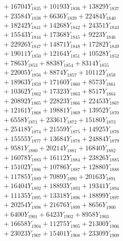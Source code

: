 \documentclass[a4paper,10pt]{article}
\begin{document}
{\begin{align}
&\;  + 16704 Y_{1835} + 10193 Y_{1836} + 13829 Y_{1837} \\[0.3ex]
&\;  + 23584 Y_{1838} + 6636 Y_{1839} + 22484 Y_{1840} \\[0.3ex]
&\;  + 18242 Y_{1841} + 14268 Y_{1842} + 24351 Y_{1843} \\[0.3ex]
&\;  + 15543 Y_{1844} + 17368 Y_{1845} + 9223 Y_{1846} \\[0.3ex]
&\;  + 22926 Y_{1847} + 14871 Y_{1848} + 17282 Y_{1849} \\[0.3ex]
&\;  + 19011 Y_{1850} + 12164 Y_{1851} + 10528 Y_{1852} \\[0.3ex]
&\;  + 7863 Y_{1853} + 8838 Y_{1854} + 8314 Y_{1855} \\[0.3ex]
&\;  + 22005 Y_{1856} + 8874 Y_{1857} + 10112 Y_{1858} \\[0.5ex]\allowbreak
&\;  + 18963 Y_{1859} + 17160 Y_{1860} + 8573 Y_{1861} \\[0.3ex]
&\;  + 10362 Y_{1862} + 17323 Y_{1863} + 8517 Y_{1864} \\[0.3ex]
&\;  + 20892 Y_{1865} + 22823 Y_{1866} + 22453 Y_{1867} \\[0.3ex]
&\;  + 12161 Y_{1868} + 19881 Y_{1869} + 13952 Y_{1870} \\[0.3ex]
&\;  + 6558 Y_{1871} + 23361 Y_{1872} + 15180 Y_{1873} \\[0.3ex]
&\;  + 25418 Y_{1874} + 21559 Y_{1875} + 14925 Y_{1876} \\[0.3ex]
&\;  + 15555 Y_{1877} + 13684 Y_{1878} + 24884 Y_{1879} \\[0.3ex]
&\;  + 9581 Y_{1880} + 20214 Y_{1881} + 16840 Y_{1882} \\[0.3ex]
&\;  + 16078 Y_{1883} + 16112 Y_{1884} + 23826 Y_{1885} \\[0.3ex]
&\;  + 15102 Y_{1886} + 10786 Y_{1887} + 12880 Y_{1888} \\[0.5ex]\allowbreak
&\;  + 11785 Y_{1889} + 7089 Y_{1890} + 20163 Y_{1891} \\[0.3ex]
&\;  + 16404 Y_{1892} + 18893 Y_{1893} + 19341 Y_{1894} \\[0.3ex]
&\;  + 11135 Y_{1895} + 13318 Y_{1896} + 18899 Y_{1897} \\[0.3ex]
&\;  + 20254 Y_{1898} + 21676 Y_{1899} + 8656 Y_{1900} \\[0.3ex]
&\;  + 6400 Y_{1901} + 6423 Y_{1902} + 8958 Y_{1903} \\[0.3ex]
&\;  + 16658 Y_{1904} + 11275 Y_{1905} + 21300 Y_{1906} \\[0.3ex]
&\;  + 23023 Y_{1907} + 15401 Y_{1908} + 23309 Y_{1909} \\[0.3ex]

\end{align}}
\end{document}
